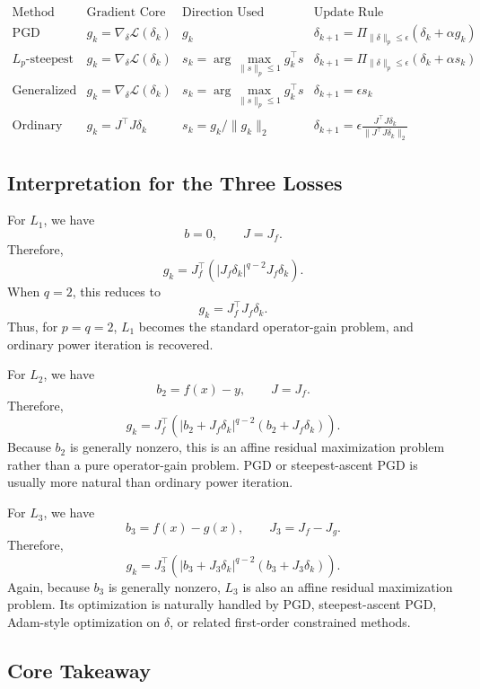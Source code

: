 \documentclass{article}
\begin{document}
\[
\begin{array}{c|c|c|c}
\text{Method}
&
\text{Gradient Core}
&
\text{Direction Used}
&
\text{Update Rule}
\\
\hline
\text{PGD}
&
g_k=\nabla_\delta \mathcal{L}(\delta_k)
&
g_k
&
\delta_{k+1}
=
\Pi_{\|\delta\|_p\le\epsilon}
(\delta_k+\alpha g_k)
\\
\hline
L_p\text{-steepest PGD}
&
g_k=\nabla_\delta \mathcal{L}(\delta_k)
&
s_k=\arg\max_{\|s\|_p\le1}g_k^\top s
&
\delta_{k+1}
=
\Pi_{\|\delta\|_p\le\epsilon}
(\delta_k+\alpha s_k)
\\
\hline
\text{Generalized Power Iteration}
&
g_k=\nabla_\delta \mathcal{L}(\delta_k)
&
s_k=\arg\max_{\|s\|_p\le1}g_k^\top s
&
\delta_{k+1}
=
\epsilon s_k
\\
\hline
\text{Ordinary Power Iteration}
&
g_k=J^\top J\delta_k
&
s_k=g_k/\|g_k\|_2
&
\delta_{k+1}
=
\epsilon
\frac{J^\top J\delta_k}{\|J^\top J\delta_k\|_2}
\end{array}
\]

\subsection{Interpretation for the Three Losses}

For $L_1$, we have
\[
b=0,
\qquad
J=J_f.
\]
Therefore,
\[
g_k
=
J_f^\top
\left(
|J_f\delta_k|^{q-2}
J_f\delta_k
\right).
\]
When $q=2$, this reduces to
\[
g_k=J_f^\top J_f\delta_k.
\]
Thus, for $p=q=2$, $L_1$ becomes the standard operator-gain problem, and ordinary power iteration is recovered.

For $L_2$, we have
\[
b_2=f(x)-y,
\qquad
J=J_f.
\]
Therefore,
\[
g_k
=
J_f^\top
\left(
|b_2+J_f\delta_k|^{q-2}
(b_2+J_f\delta_k)
\right).
\]
Because $b_2$ is generally nonzero, this is an affine residual maximization problem rather than a pure operator-gain problem. PGD or steepest-ascent PGD is usually more natural than ordinary power iteration.

For $L_3$, we have
\[
b_3=f(x)-g(x),
\qquad
J_3=J_f-J_g.
\]
Therefore,
\[
g_k
=
J_3^\top
\left(
|b_3+J_3\delta_k|^{q-2}
(b_3+J_3\delta_k)
\right).
\]
Again, because $b_3$ is generally nonzero, $L_3$ is also an affine residual maximization problem. Its optimization is naturally handled by PGD, steepest-ascent PGD, Adam-style optimization on $\delta$, or related first-order constrained methods.

\subsection{Core Takeaway}
\end{document}
